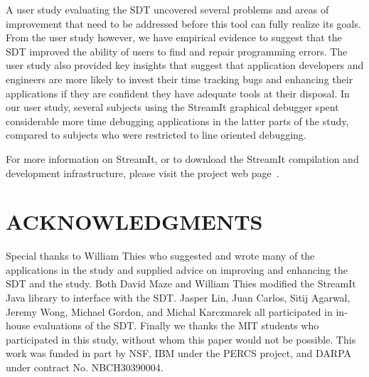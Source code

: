 \documentclass[times, 10pt,twocolumn]{article}
\begin{document}
A user study  evaluating the SDT uncovered several  problems and areas
of improvement  that need to be  addressed before this  tool can fully
realize its  goals.  From  the user study  however, we  have empirical
evidence to suggest that the SDT improved the ability of users to find
and  repair  programming errors.  The  user  study  also provided  key
insights that  suggest that  application developers and  engineers are
more likely  to invest  their time tracking  bugs and  enhancing their
applications if they  are confident they have adequate  tools at their
disposal.  In our  user  study, several  subjects  using the  StreamIt
graphical debugger spent considerable more time debugging applications
in  the latter  parts  of the  study,  compared to  subjects who  were
restricted to line oriented debugging.

For  more  information  on  StreamIt,  or  to  download  the  StreamIt
compilation and  development infrastructure, please  visit the project
web page~\cite{streamit-web}.



\section*{ACKNOWLEDGMENTS}

Special thanks  to William Thies who  suggested and wrote  many of the
applications  in  the  study  and  supplied advice  on  improving  and
enhancing the  SDT and  the study. Both  David Maze and  William Thies
modified the StreamIt  Java library to interface with  the SDT. Jasper
Lin,  Juan Carlos,  Sitij Agarwal,  Jeremy Wong,  Michael  Gordon, and
Michal Karczmarek all participated in in-house evaluations of the SDT.
Finally we  thanks the  MIT students who  participated in  this study,
without whom this  paper would not be possible.   This work was funded
in part by NSF, IBM under  the PERCS project, and DARPA under contract
No. NBCH30390004.



\end{document}
